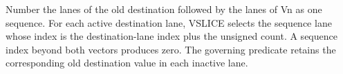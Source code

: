 Number the lanes of the old destination followed by the lanes of Vn as one
sequence.  For each active destination lane, VSLICE selects the sequence lane
whose index is the destination-lane index plus the unsigned count.  A sequence
index beyond both vectors produces zero.  The governing predicate retains the
corresponding old destination value in each inactive lane.
